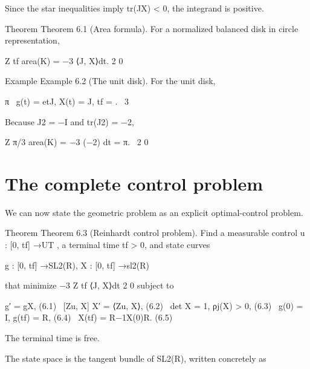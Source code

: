 Since the star inequalities imply tr(JX) < 0, the integrand is positive.


\begin{statementbox}{Theorem}
Theorem 6.1 (Area formula). For a normalized balanced disk in circle representation,
\end{statementbox}

Z tf area(K) = −3 ⟨J, X⟩dt. 2 0


\begin{statementbox}{Example}
Example 6.2 (The unit disk). For the unit disk,
\end{statementbox}

\begin{displaytext}
π \
g(t) = etJ, X(t) = J, tf = . \
3
\end{displaytext}

\begin{displaytext}
Because J2 = −I and tr(J2) = −2,
\end{displaytext}

\begin{displaytext}
Z π/3 area(K) = −3 (−2) dt = π. \
2 0
\end{displaytext}

\section{The complete control problem}

We can now state the geometric problem as an explicit optimal-control problem.


\begin{statementbox}{Theorem}
Theorem 6.3 (Reinhardt control problem). Find a measurable control u : [0, tf] →UT , a terminal time tf > 0, and state curves
\end{statementbox}

\begin{displaytext}
g : [0, tf] →SL2(R), X : [0, tf] →sl2(R)
\end{displaytext}

that minimize −3 Z tf ⟨J, X⟩dt 2 0 subject to


\begin{displaytext}
g′ = gX, (6.1) \
[Zu, X] X′ = ⟨Zu, X⟩, (6.2) \
det X = 1, ρj(X) > 0, (6.3) \
g(0) = I, g(tf) = R, (6.4) \
X(tf) = R−1X(0)R. (6.5)
\end{displaytext}

The terminal time is free.


The state space is the tangent bundle of SL2(R), written concretely as


